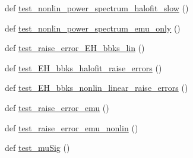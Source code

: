 \begin{DoxyCompactItemize}
\item 
def \mbox{\hyperlink{namespaceccl__test__power_a050922793db7934bbd53d31e87dd1ff1}{test\+\_\+nonlin\+\_\+power\+\_\+spectrum\+\_\+halofit\+\_\+slow}} ()
\item 
def \mbox{\hyperlink{namespaceccl__test__power_a8d91ea890e8e45915700d1467dd11984}{test\+\_\+nonlin\+\_\+power\+\_\+spectrum\+\_\+emu\+\_\+only}} ()
\item 
def \mbox{\hyperlink{namespaceccl__test__power_a870b9e0aaacdf9414f50076dd8f7e6aa}{test\+\_\+raise\+\_\+error\+\_\+\+E\+H\+\_\+bbks\+\_\+lin}} ()
\item 
def \mbox{\hyperlink{namespaceccl__test__power_a649d531f4ceee50a6345fcb2fa05e3f1}{test\+\_\+\+E\+H\+\_\+bbks\+\_\+halofit\+\_\+raise\+\_\+errors}} ()
\item 
def \mbox{\hyperlink{namespaceccl__test__power_ab6f5091035ac55bb007b0d7f3822ffbc}{test\+\_\+\+E\+H\+\_\+bbks\+\_\+nonlin\+\_\+linear\+\_\+raise\+\_\+errors}} ()
\item 
def \mbox{\hyperlink{namespaceccl__test__power_aec6c96676e6bad8448cc1fcab8dcf703}{test\+\_\+raise\+\_\+error\+\_\+emu}} ()
\item 
def \mbox{\hyperlink{namespaceccl__test__power_ae5cff37be020cc048e6e4c6e98d1235f}{test\+\_\+raise\+\_\+error\+\_\+emu\+\_\+nonlin}} ()
\item 
def \mbox{\hyperlink{namespaceccl__test__power_ad55d8b292007bcc38f3654e024211574}{test\+\_\+mu\+Sig}} ()
\end{DoxyCompactItemize}
